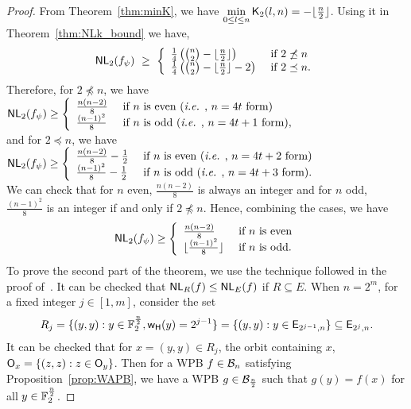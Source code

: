 \documentclass{llncs}
\begin{document}
\begin{proof}
From Theorem~\ref{thm:minK}, we have 
$\min\limits_{0 \leq l \leq n} \mathsf{K}_{2}(l,n) = -\lfloor \frac{n}{2} \rfloor$. 
Using it in Theorem~\ref{thm:NLk_bound} we have,
$$\mathsf{NL}_{2}(f_\psi) ~\geq ~ 
\left\{ \begin{array}{ll}
\frac{1}{4}\left({n \choose 2} - \lfloor \frac{n}{2} \rfloor\right)  & \text{ if }  2 \not\preceq n \\
\frac{1}{4}\left({n \choose 2} -\lfloor \frac{n}{2} \rfloor - 2\right) & \text{ if } 2 \preceq n.
\end{array}   \right.$$
Therefore, for $2 \npreceq n$, we have
$\mathsf{NL}_{2}(f_\psi) \geq \left\{
\begin{array}{ll}
 \frac{n(n-2)}{8} & \text{ if } n \text{ is even (\textit{i.e.} , $n = 4t$ form)}\\
 \frac{(n-1)^2}{8} & \text{ if } n \text{ is odd (\textit{i.e.} , $n = 4t+1$ form)},
\end{array} \right.$\\
and for $2 \preceq n$, we have 
$\mathsf{NL}_{2}(f_\psi) \geq \left\{
\begin{array}{ll}
 \frac{n(n-2)}{8}-\frac{1}{2} & \text{ if } n \text{ is even (\textit{i.e.} , $n = 4t+2$ form)} \\
 \frac{(n-1)^2}{8}-\frac{1}{2} & \text{ if } n \text{ is odd (\textit{i.e.} , $n = 4t+3$ form)}.
\end{array} \right.$\\
We can check that for $n$ even, $\frac{n(n-2)}{8}$ is always an integer and for 
$n$ odd, $\frac{(n-1)^2}{8}$ is an integer if and only if $2 \npreceq n$. Hence, combining the cases, we have 
$$\mathsf{NL}_{2}(f_\psi) \geq \left\{
\begin{array}{ll}
 \frac{n(n-2)}{8} & \text{ if } n \text{ is even} \\
 \lfloor\frac{(n-1)^2}{8}\rfloor & \text{ if } n \text{ is odd}.
\end{array} \right.$$
To prove the second part of the theorem, we use the technique followed in the proof of~\cite[Theorem-3.14]{DCC:LiuMes19}.
It can be checked that $\mathsf{NL}_{R}(f) \leq \mathsf{NL}_{E}(f)$ if $R \subseteq E$.
When $n = 2^m$, for a fixed integer $j \in [1,m]$, consider the set  
$$R_j = \{(y,y) : y \in \mathbb{F}_2^{\frac{n}{2}}, \mathsf{w_H}(y)= 2^{j-1} \} = \{(y,y) : y \in \mathsf{E}_{2^{j-1},n} \} \subseteq \mathsf{E}_{2^j,n}.$$
It can be checked that for $x = (y,y) \in R_j$, the orbit containing $x$, $\mathsf{O}_x = \{(z,z) : z \in \mathsf{O}_y\}$.
Then for a WPB $f \in \mathcal{B}_n$ satisfying Proposition~\ref{prop:WAPB}, we have a WPB $g \in \mathcal{B}_{\frac{n}{2}}$  such that $g(y) = f(x)$ for all $y \in \mathbb{F}_2^{\frac{n}{2}}$. 

\end{proof}
\end{document}
